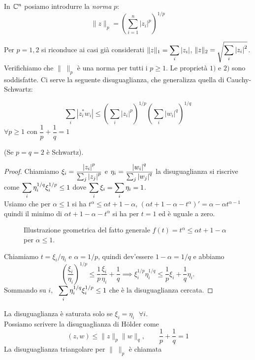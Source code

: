 \begin{definition}[norma $p$]
In $\mathbb C^n$ posiamo introdurre la \emph{norma} $p$:
\[
\|z\|_p=\left(\sum_{i=1}^n|z_i|^p\right)^{1/p}
\]
\end{definition}
Per $p=1, 2$ si riconduce ai casi già considerati 
$\displaystyle \|z\|_1 = \sum_i {\left|z_i\right|}$, $\displaystyle \|z\|_2 = \sqrt{ \sum_i {\left|z_i\right|}^2 }$.
Verifichiamo che $\| \; \|_p$ è una norma per tutti i $p \geq 1$.
Le proprietà $1)$ e $2)$ sono soddisfatte. Ci serve la seguente
disuguaglianza, che generalizza quella di Cauchy-Schwartz:
\begin{theorem}
\[
\sum_i|z_i^*w_i|\leq \left(\sum_i|z_i|^p\right)^{1/p}\left(\sum_i|w_i|^q\right)^{1/q}
\]
$\forall p \geq 1$ con $\dfrac{1}{p} + \dfrac{1}{q} = 1$
\end{theorem}
(Se $p = q = 2$ è Schwartz).
\begin{proof}
Chiamiamo
$\displaystyle \xi_i = \frac{{\left|z_i\right|}^p}{\sum_j {\left|z_j\right|}^p}$
e
$\displaystyle \eta_i = \frac{{\left|w_i\right|}^q}{\sum_j {\left|w_j\right|}^q}$
la disuguaglianza si riscrive come
$\displaystyle \sum_i \eta_i^{1/q} \xi_i^{1/p} \leq 1$ dove 
$\displaystyle \sum_i \xi_i = \sum_i \eta_i = 1$.\\
Usiamo che per $\alpha \leq 1$  si ha $t^\alpha \leq \alpha t + 1 - \alpha$,
$(\alpha t + 1 - \alpha - t^\alpha)' = \alpha - \alpha t^{\alpha-1}$
quindi il minimo di $\alpha t + 1 - \alpha - t^\alpha$ si ha
per $t=1$ ed è uguale a zero.\\
\begin{figure}[!htb]
	\centering 
		\def\svgwidth{\columnwidth}
		\resizebox{10cm}{6cm}{}
	\caption{Illustrazione geometrica del fatto generale
	 $f(t) = t^\alpha \leq \alpha t + 1 - \alpha \;$ per $\alpha \leq 1$. 
	\label{2nrm_tang}}
\end{figure}

Chiamiamo $t = \xi_i/\eta_i$ e $\alpha = 1/p$, quindi dev'essere
$1 - \alpha = 1/q$ e abbiamo
\[
\left( \frac{\xi_i}{\eta_i} \right)^{1/p} \leq 
\frac{1}{p} \frac{\xi_i}{\eta_i} + \frac{1}{q} \implies
\xi_i^{1/p} \eta_i^{1/q} \leq \frac{1}{p} \xi_i + \frac{1}{q} \eta_i
.\]
Sommando su $i, \;$ $\displaystyle \sum_i \eta_i^{1/q} \xi_i^{1/p} \leq 1$
che è la disuguaglianza cercata.
\end{proof}
La disuguaglianza è saturata solo se $\xi_i = \eta_i \;$ $\forall i$. \\
Possiamo scrivere la disuguaglianza di H\"{o}lder come 
\[
(z, w) \leq \|z\|_p \|w\|_q, \qquad \frac{1}{p} + \frac{1}{q} = 1
\]
La disuguaglianza triangolare per $\| \; \|_p$ è chiamata
